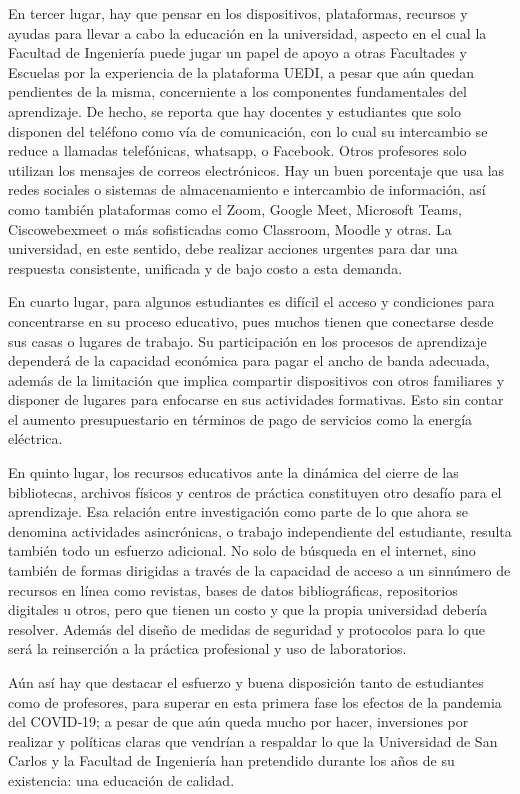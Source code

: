 \documentclass[12pt,spanish,Letterpaper,openany]{book}
\begin{document}
En tercer lugar, hay que pensar en los dispositivos, plataformas, recursos y ayudas para llevar a cabo la educación en la universidad, aspecto en el cual la Facultad de Ingeniería puede jugar un papel de apoyo a otras Facultades y Escuelas por la experiencia de la plataforma UEDI, a pesar que aún quedan pendientes de la misma, concerniente a los componentes fundamentales del aprendizaje. De hecho, se reporta que hay docentes y estudiantes que solo disponen del teléfono como vía de comunicación, con lo cual su intercambio se reduce a llamadas telefónicas, whatsapp, o Facebook. Otros profesores solo utilizan los mensajes de correos electrónicos. Hay un buen porcentaje que usa las redes sociales o sistemas de almacenamiento e intercambio de información, así como también plataformas como el Zoom, Google Meet, Microsoft Teams, Ciscowebexmeet o más sofisticadas como Classroom, Moodle y otras. La universidad, en este sentido, debe realizar acciones urgentes para dar una respuesta consistente, unificada y de bajo costo a esta demanda.

En cuarto lugar, para algunos estudiantes es difícil el acceso y condiciones para concentrarse en su proceso educativo, pues muchos tienen que conectarse desde sus casas o lugares de trabajo. Su participación en los procesos de aprendizaje dependerá de la capacidad económica para pagar el ancho de banda adecuada, además de la limitación que implica compartir dispositivos con otros familiares y disponer de lugares para enfocarse en sus actividades formativas. Esto sin contar el aumento presupuestario en términos de pago de servicios como la energía eléctrica.

En quinto lugar, los recursos educativos ante la dinámica del cierre de las bibliotecas, archivos físicos y centros de práctica constituyen otro desafío para el aprendizaje. Esa relación entre investigación como parte de lo que ahora se denomina actividades asincrónicas, o trabajo independiente del estudiante, resulta también todo un esfuerzo adicional. No solo de búsqueda en el internet, sino también de formas dirigidas a través de la capacidad de acceso a un sinnúmero de recursos en línea como revistas, bases de datos bibliográficas, repositorios digitales u otros, pero que tienen un costo y que la propia universidad debería resolver. Además del diseño de medidas de seguridad y protocolos para lo que será la reinserción a la práctica profesional y uso de laboratorios.

Aún así hay que destacar el esfuerzo y buena disposición tanto de estudiantes como de profesores, para superar en esta primera fase los efectos de la pandemia del COVID‐19; a pesar de que aún queda mucho por hacer, inversiones por realizar y políticas claras que vendrían a respaldar lo que la Universidad de San Carlos y la Facultad de Ingeniería han pretendido durante los años de su existencia: una educación de calidad.
\end{document}
